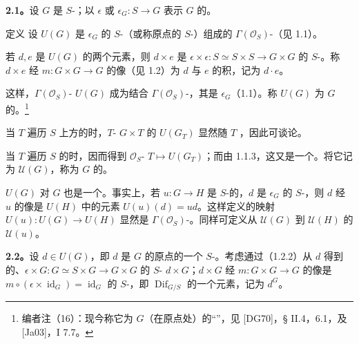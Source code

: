\textbf{2.1。}设 $G$ 是 $S$-；以 $\epsilon$ 或 $\epsilon_G:S\to G$ 表示 $G$ 的。
\begin{SGAresult}{定义}{}
设 $U(G)$ 是 $\epsilon_G$ 的 $S$-（或称原点的 $S$-）组成的 $\Gamma(\mathcal O_S)$-（见 1.1）。

若 $d,e$ 是 $U(G)$ 的两个元素，则 $d\times e$ 是 $\epsilon\times\epsilon:S\simeq S\times S\to G\times G$ 的 $S$-。称 $d\times e$ 经 $m:G\times G\to G$ 的像（见 1.2）为 $d$ 与 $e$ 的积，记为 $d\cdot e$。

这样，$\Gamma(\mathcal O_S)$- $U(G)$ 成为结合 $\Gamma(\mathcal O_S)$-，其是 $\epsilon_G$（1.1）。称 $U(G)$ 为 $G$ 的。\footnote{编者注（16）：现今称它为 $G$（在原点处）的“”，见 [DG70]，§ II.4，6.1，及 [Ja03]，I 7.7。}
\end{SGAresult}
当 $T$ 遍历 $S$ 上方的时，$T$- $G\times T$ 的 $U(G_T)$ 显然随 $T$ ，因此可谈论。

当 $T$ 遍历 $S$ 的时，因而得到 $\mathcal O_S$- $T\mapsto U(G_T)$；而由 1.1.3，这又是一个。将它记为 $\mathcal U(G)$，称为 $G$ 的。

 $U(G)$ 对 $G$ 也是一个。事实上，若 $u:G\to H$ 是 $S$-的，$d$ 是 $\epsilon_G$ 的 $S$-，则 $d$ 经 $u$ 的像是 $U(H)$ 中的元素 $U(u)(d)=ud$。这样定义的映射 $U(u):U(G)\to U(H)$ 显然是 $\Gamma(\mathcal O_S)$-。同样可定义从 $\mathcal U(G)$ 到 $\mathcal U(H)$ 的 $\mathcal U(u)$。

\textbf{2.2。}设 $d\in U(G)$，即 $d$ 是 $G$ 的原点的一个 $S$-。考虑通过（1.2.2）从 $d$ 得到的、$\epsilon\times G:G\simeq S\times G\to G\times G$ 的 $S$- $d\times G$；$d\times G$ 经 $m:G\times G\to G$ 的像是 $m\circ(\epsilon\times\operatorname{id}_G)=\operatorname{id}_G$ 的 $S$-，即 $\operatorname{Dif}_{G/S}$ 的一个元素，记为 $d^G$。


